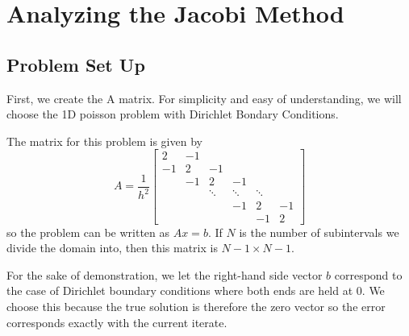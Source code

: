 \documentclass[11pt]{article}
\begin{document}
    \hypertarget{analyzing-the-jacobi-method}{%
\section{Analyzing the Jacobi
Method}\label{analyzing-the-jacobi-method}}

    \hypertarget{problem-set-up}{%
\subsection{Problem Set Up}\label{problem-set-up}}

First, we create the A matrix. For simplicity and easy of understanding,
we will choose the 1D poisson problem with Dirichlet Bondary Conditions.

The matrix for this problem is given by \[
A = \frac{1}{h^2}
\begin{bmatrix}
2  & -1 &        &        &        &   \\
-1 &  2 & -1     &        &        &   \\
   & -1 &  2     &     -1 &        &   \\
   &    & \ddots & \ddots & \ddots &   \\
   &    &        &     -1 &      2 & -1 \\
   &    &        &        &     -1 &  2
\end{bmatrix}
\] so the problem can be written as \(Ax = b\). If \(N\) is the number
of subintervals we divide the domain into, then this matrix is
\(N-1 \times N-1\).

For the sake of demonstration, we let the right-hand side vector \(b\)
correspond to the case of Dirichlet boundary conditions where both ends
are held at \(0\). We choose this because the true solution is therefore
the zero vector so the error corresponds exactly with the current
iterate.
\end{document}
